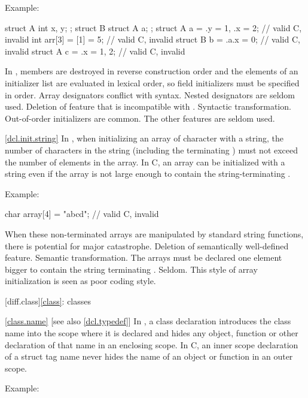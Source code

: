 Example:

\begin{codeblock}
struct A { int x, y; };
struct B { struct A a; };
struct A a = {.y = 1, .x = 2};  // valid C, invalid \Cpp
int arr[3] = {[1] = 5};         // valid C, invalid \Cpp
struct B b = {.a.x = 0};        // valid C, invalid \Cpp
struct A c = {.x = 1, 2};       // valid C, invalid \Cpp
\end{codeblock}
\rationale
In \Cpp, members are destroyed in reverse construction order
and the elements of an initializer list are evaluated in lexical order,
so field initializers must be specified in order.
Array designators conflict with  syntax.
Nested designators are seldom used.
\effect
Deletion of feature that is incompatible with \Cpp.
\difficulty
Syntactic transformation.
\howwide
Out-of-order initializers are common.
The other features are seldom used.

\ref{dcl.init.string}
\change In \Cpp, when initializing an array of character with a string, the number of
characters in the string (including the terminating ) must not exceed the
number of elements in the array. In C, an array can be initialized with a string even if
the array is not large enough to contain the string-terminating .

Example:

\begin{codeblock}
char array[4] = "abcd";         // valid C, invalid \Cpp
\end{codeblock}
\rationale
When these non-terminated arrays are manipulated by standard
string functions, there is potential for major catastrophe.
\effect
Deletion of semantically well-defined feature.
\difficulty
Semantic transformation.
The arrays must be declared one element bigger to contain the
string terminating .
\howwide
Seldom.
This style of array initialization is seen as poor coding style.

[diff.class]{\ref{class}: classes}

\ref{class.name} [see also \ref{dcl.typedef}]
\change In \Cpp, a class declaration introduces the class name into the scope where it is
declared and hides any object, function or other declaration of that name in an enclosing
scope. In C, an inner scope declaration of a struct tag name never hides the name of an
object or function in an outer scope.

Example:

